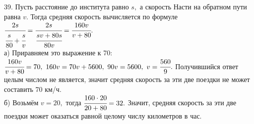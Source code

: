 39. Пусть расстояние до института равно $s,$ а скорость Насти на обратном пути равна $v.$ Тогда средняя скорость вычисляется по формуле $\cfrac{2s}{\cfrac{s}{80}+\cfrac{s}{v}}=\cfrac{2s}{\cfrac{sv+80s}{80v}}=\cfrac{160v}{v+80}.$\\
а) Приравняем это выражение к 70: $\cfrac{160v}{v+80}=70,\ 160v=70v+5600,\ 90v=5600,\ v=\cfrac{560}{9}.$ Получившийся ответ целым числом не является, значит средняя скорость за эти две поездки не может составить 70 км/ч.\\
б) Возьмём $v=20,$ тогда $\cfrac{160\cdot20}{20+80}=32.$ Значит, средняя скорость за эти две поездки может оказаться равной целому числу километров в час.\\

